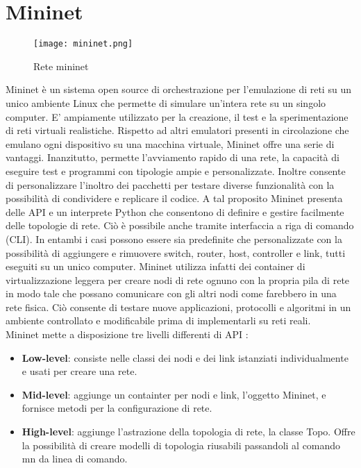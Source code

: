 \section{Mininet}
\label{ch:Mininet}
\begin{figure}[h]
    \centering
   \texttt{[image: mininet.png]}
    \caption{Rete mininet}
    \label{fig:mininet}
\end{figure}
Mininet \cite{mininet} è un sistema open source di orchestrazione per l'emulazione di reti su un unico ambiente Linux che permette di simulare un'intera rete su un singolo computer.
E' ampiamente utilizzato per la creazione, il test e la sperimentazione di reti virtuali realistiche.
Rispetto ad altri emulatori presenti in circolazione che emulano ogni dispositivo su una macchina virtuale, Mininet offre una serie di vantaggi. 
Inanzitutto, permette l'avviamento rapido di una rete, la capacità di eseguire test e programmi con tipologie ampie e personalizzate. 
Inoltre consente di personalizzare l'inoltro dei pacchetti per testare diverse funzionalità con la possibilità di condividere e replicare il codice.
A tal proposito Mininet presenta delle API e un interprete Python che consentono di definire e gestire facilmente delle topologie di rete.
Ciò è possibile anche tramite interfaccia a riga di comando (CLI). In entambi i casi possono essere sia predefinite che personalizzate con la possibilità di 
aggiungere e rimuovere switch, router, host, controller e link, tutti eseguiti su un unico computer.
Mininet utilizza infatti dei container di virtualizzazione leggera per creare nodi di rete ognuno con la propria pila di rete in modo tale che possano comunicare con gli 
altri nodi come farebbero in una rete fisica. 
Ciò consente di testare nuove applicazioni, protocolli e algoritmi in un ambiente controllato e modificabile prima di implementarli su reti reali.
\\Mininet mette a disposizione tre livelli differenti di API \cite{introMin}:
\begin{itemize}
\item \textbf{Low-level}: consiste nelle classi dei nodi e dei link istanziati individualmente e usati per creare una rete.
\item \textbf{Mid-level}: aggiunge un containter per nodi e link, l'oggetto Mininet, e fornisce metodi per la configurazione di rete.
\item \textbf{High-level}: aggiunge l'astrazione della topologia di rete, la classe Topo. Offre la possibilità di creare modelli di topologia riusabili passandoli al comando mn da linea di comando.
\end{itemize}
